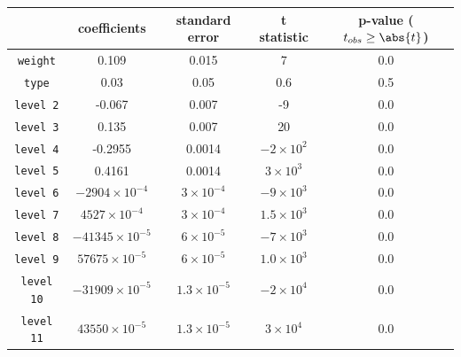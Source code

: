 \begin{table}[htbp]
  \centering
  \begin{tabular}{@{}ccccc@{}}
  \toprule
                     & \textbf{coefficients}       & \textbf{standard error} & \textbf{t statistic} & \textbf{p-value} ($t_{obs} \ge \abs{t}$)  \\
  \midrule
  \texttt{weight}    & 0.109                       & 0.015                   & 7                    & 0.0                                       \\
  \texttt{type}      & 0.03                        & 0.05                    & 0.6                  & 0.5                                       \\
  \texttt{level 2}   & -0.067                      & 0.007                   & -9                   & 0.0                                       \\
  \texttt{level 3}   & 0.135                       & 0.007                   & 20                   & 0.0                                       \\
  \texttt{level 4}   & -0.2955                     & 0.0014                  & $-2 \times 10^2$     & 0.0                                       \\
  \texttt{level 5}   & 0.4161                      & 0.0014                  & $3 \times 10^3$      & 0.0                                       \\
  \texttt{level 6}   & $-2904 \times 10^{-4}$      & $3 \times 10^{-4}$      & $-9 \times 10^3$     & 0.0                                       \\
  \texttt{level 7}   & $4527 \times 10^{-4}$       & $3 \times 10^{-4}$      & $1.5 \times 10^3$    & 0.0                                       \\
  \texttt{level 8}   & $-41345 \times 10^{-5}$     & $6 \times 10^{-5}$      & $-7 \times 10^3$     & 0.0                                       \\
  \texttt{level 9}   & $57675 \times 10^{-5}$      & $6 \times 10^{-5}$      & $1.0 \times 10^3$    & 0.0                                       \\
  \texttt{level 10}  & $-31909 \times 10^{-5}$     & $1.3 \times 10^{-5}$    & $-2 \times 10^4$     & 0.0                                       \\
  \texttt{level 11}  & $43550 \times 10^{-5}$      & $1.3 \times 10^{-5}$    & $3 \times 10^4$      & 0.0                                       \\

\end{tabular}
\end{table}
